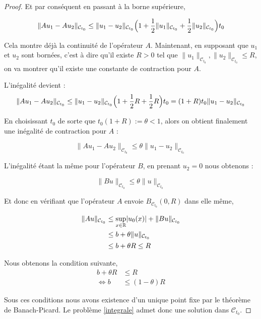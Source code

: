\begin{proof}
    Et par conséquent en passant à la borne supérieure, 

    $$\|Au_1 - Au_2\|_{\mathcal{C}_{t_0}} \leq \|u_1 - u_2\|_{\mathcal{C}_{t_0}} \Bigl( 1 + \frac{1}{2} \| u_1\|_{\mathcal{C}_{t_0}}+ \frac{1}{2} \|u_2 \|_{\mathcal{C}_{t_0}} \Bigr) t_0$$

    Cela montre déjà la continuité de l'opérateur $A$. Maintenant, en supposant que $u_1$ et $u_2$ sont bornées,
    c'est à dire qu'il existe $R > 0$ tel que $\|u_1\|_{\mathcal{C}_{t_0}},\|u_2\|_{\mathcal{C}_{t_0}} \leq R$, on va montrer qu'il existe une constante de contraction pour $A$. 
    
    L'inégalité devient :
    $$\|Au_1 - Au_2\|_{\mathcal{C}_{t_0}} \leq \|u_1 - u_2\|_{\mathcal{C}_{t_0}} \Bigl( 1 + \frac{1}{2} R+ \frac{1}{2} R \Bigr) t_0 = ( 1 + R) t_0 \|u_1 - u_2\|_{\mathcal{C}_{t_0}}$$

    
    En choisissant $t_0$ de sorte que $t_0 (1 + R) := \theta < 1$, alors on obtient finalement une inégalité de contraction pour $A$ :

    $$\|Au_1 - Au_2\|_{\mathcal{C}_{t_0}} \leq \theta \|u_1 - u_2\|_{\mathcal{C}_{t_0}}$$

    L'inégalité étant la même pour l'opérateur $B$, en prenant $u_2 = 0$ nous obtenons : 

    $$\|Bu\|_{\mathcal{C}_{t_0}} \leq \theta \|u\|_{\mathcal{C}_{t_0}}$$

    \vspace{1em}
    Et donc en vérifiant que l'opérateur $A$ envoie $B_{\mathcal{C}_{t_0}}(0,R)$ dans elle même, 

    \begin{equation*}
    \begin{split}
        \|Au\|_{\mathcal{C}_{t_0}} &\leq \underset{x \in \mathbb{R}}{\sup} |u_0 (x)| + \|Bu\|_{\mathcal{C}_{t_0}} \\
        &\leq b + \theta\|u\|_{\mathcal{C}_{t_0}} \\
        &\leq b + \theta R \leq R
    \end{split}
    \end{equation*}


    Nous obtenons la condition suivante,
    \begin{equation*}
    \begin{split}
        b + \theta R &\leq R \\
        \Leftrightarrow b &\leq (1 - \theta)R
    \end{split}
    \end{equation*}

    Sous ces conditions nous avons existence d'un unique point fixe par le théorème de Banach-Picard.
    Le problème \ref{integrale} admet donc une solution dans $\mathcal{C}_{t_0}$.

\end{proof}


